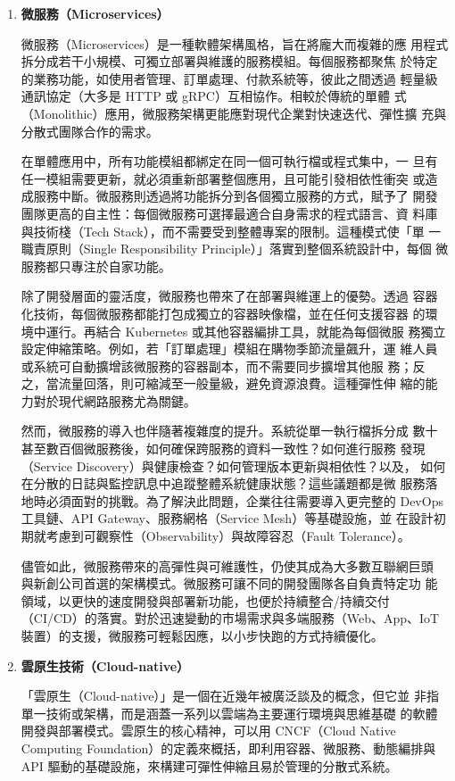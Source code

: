 \documentclass[12pt,a4paper]{article}
\begin{document}
\begin{enumerate}[label={(\zhdig*)}, leftmargin=2\parindent, listparindent=\parindent]
\begin{enumerate}[label={(\arabic*)}, leftmargin=\parindent, listparindent=\parindent]
\item\textbf{微服務（Microservices）\cite{10}}

微服務（Microservices）是一種軟體架構風格，旨在將龐大而複雜的應
用程式拆分成若干小規模、可獨立部署與維護的服務模組。每個服務都聚焦
於特定的業務功能，如使用者管理、訂單處理、付款系統等，彼此之間透過
輕量級通訊協定（大多是 HTTP 或 gRPC）互相協作。相較於傳統的單體
式（Monolithic）應用，微服務架構更能應對現代企業對快速迭代、彈性擴
充與分散式團隊合作的需求。

在單體應用中，所有功能模組都綁定在同一個可執行檔或程式集中，一
旦有任一模組需要更新，就必須重新部署整個應用，且可能引發相依性衝突
或造成服務中斷。微服務則透過將功能拆分到各個獨立服務的方式，賦予了
開發團隊更高的自主性：每個微服務可選擇最適合自身需求的程式語言、資
料庫與技術棧（Tech Stack），而不需要受到整體專案的限制。這種模式使「單
一職責原則（Single Responsibility Principle）」落實到整個系統設計中，每個
微服務都只專注於自家功能。

除了開發層面的靈活度，微服務也帶來了在部署與維運上的優勢。透過
容器化技術，每個微服務都能打包成獨立的容器映像檔，並在任何支援容器
的環境中運行。再結合 Kubernetes 或其他容器編排工具，就能為每個微服
務獨立設定伸縮策略。例如，若「訂單處理」模組在購物季節流量飆升，運
維人員或系統可自動擴增該微服務的容器副本，而不需要同步擴增其他服
務；反之，當流量回落，則可縮減至一般量級，避免資源浪費。這種彈性伸
縮的能力對於現代網路服務尤為關鍵。

然而，微服務的導入也伴隨著複雜度的提升。系統從單一執行檔拆分成
數十甚至數百個微服務後，如何確保跨服務的資料一致性？如何進行服務
發現（Service Discovery）與健康檢查？如何管理版本更新與相依性？以及，
如何在分散的日誌與監控訊息中追蹤整體系統健康狀態？這些議題都是微
服務落地時必須面對的挑戰。為了解決此問題，企業往往需要導入更完整的
DevOps 工具鏈、API Gateway、服務網格（Service Mesh）等基礎設施，並
在設計初期就考慮到可觀察性（Observability）與故障容忍（Fault Tolerance）。

儘管如此，微服務帶來的高彈性與可維護性，仍使其成為大多數互聯網巨頭
與新創公司首選的架構模式。微服務可讓不同的開發團隊各自負責特定功
能領域，以更快的速度開發與部署新功能，也便於持續整合/持續交付
（CI/CD）的落實。對於迅速變動的市場需求與多端服務（Web、App、IoT
裝置）的支援，微服務可輕鬆因應，以小步快跑的方式持續優化。

\item\textbf{雲原生技術（Cloud-native）}

「雲原生（Cloud-native）」是一個在近幾年被廣泛談及的概念，但它並
非指單一技術或架構，而是涵蓋一系列以雲端為主要運行環境與思維基礎
的軟體開發與部署模式。雲原生的核心精神，可以用 CNCF（Cloud Native
Computing Foundation）的定義來概括，即利用容器、微服務、動態編排與
API 驅動的基礎設施，來構建可彈性伸縮且易於管理的分散式系統。


\end{enumerate}
\end{enumerate}
\end{document}
